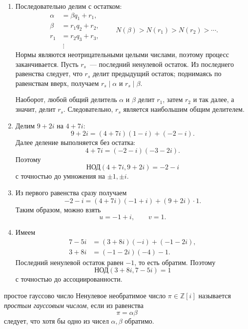 \begin{enumerate}[label=\textbf{\alph*)}, leftmargin=8mm]
    \item Последовательно делим с остатком:
    \[
    \begin{aligned}
        \alpha&=\beta q_1+r_1,\\
        \beta&=r_1q_2+r_2,\\
        r_1&=r_2q_3+r_3,\\
        &\ \vdots
    \end{aligned}
    \qquad
    N(\beta)>N(r_1)>N(r_2)>\dotsb.
    \]
    Нормы являются неотрицательными целыми числами, поэтому процесс
    заканчивается. Пусть $r_s$~--- последний ненулевой остаток. Из
    последнего равенства следует, что $r_s$ делит предыдущий остаток;
    поднимаясь по равенствам вверх, получаем
    $r_s\mid\alpha$ и $r_s\mid\beta$.

    Наоборот, любой общий делитель $\alpha$ и $\beta$ делит $r_1$,
    затем $r_2$ и так далее, а значит, делит $r_s$. Следовательно,
    $r_s$ является наибольшим общим делителем.

    \item Делим $9+2i$ на $4+7i$:
    \[
        9+2i=(4+7i)(1-i)+(-2-i).
    \]
    Далее деление выполняется без остатка:
    \[
        4+7i=(-2-i)(-3-2i).
    \]
    Поэтому
    \[
        \text{НОД}(4+7i,9+2i)=-2-i
    \]
    с точностью до умножения на $\pm1,\pm i$.

    \item Из первого равенства сразу получаем
    \[
        -2-i=(4+7i)(-1+i)+(9+2i)\cdot1.
    \]
    Таким образом, можно взять
    \[
        u=-1+i,\qquad v=1.
    \]

    \item Имеем
    \[
    \begin{aligned}
        7-5i&=(3+8i)(-i)+(-1-2i),\\
        3+8i&=(-1-2i)(-4)-1.
    \end{aligned}
    \]
    Последний ненулевой остаток равен $-1$, то есть обратим. Поэтому
    \[
        \text{НОД}(3+8i,7-5i)=1
    \]
    с точностью до ассоциированности.
\end{enumerate}

\newpage

\begin{defbox}{простое гауссово число}
Ненулевое необратимое число $\pi\in\mathbb Z[i]$ называется
\emph{простым гауссовым числом}, если из равенства
\[
    \pi=\alpha\beta
\]
следует, что хотя бы одно из чисел $\alpha,\beta$ обратимо.
\end{defbox}

